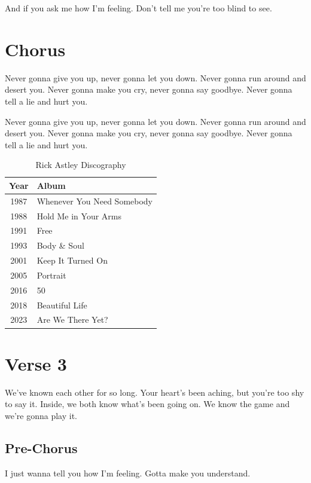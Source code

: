 \documentclass{article}
\begin{document}
And if you ask me how I'm feeling.
Don't tell me you're too blind to see.

\section{Chorus}

Never gonna give you up, never gonna let you down.
Never gonna run around and desert you.
Never gonna make you cry, never gonna say goodbye.
Never gonna tell a lie and hurt you.

Never gonna give you up, never gonna let you down.
Never gonna run around and desert you.
Never gonna make you cry, never gonna say goodbye.
Never gonna tell a lie and hurt you.

\begin{table}
    \centering
    \begin{tabular}{c l}
        \toprule
        Year & Album \\
        \midrule
         1987 & Whenever You Need Somebody \\
         1988 & Hold Me in Your Arms \\
         1991 & Free \\
         1993 & Body \& Soul \\
         2001 & Keep It Turned On \\
         2005 & Portrait \\
         2016 & 50 \\
         2018 & Beautiful Life \\
         2023 & Are We There Yet? \\
         \bottomrule
    \end{tabular}
    \caption{Rick Astley Discography}
    \label{tab:discography}
\end{table}

\section{Verse 3}

We've known each other for so long.
Your heart's been aching, but you're too shy to say it.
Inside, we both know what's been going on.
We know the game and we're gonna play it.

\subsection{Pre-Chorus}

I just wanna tell you how I'm feeling.
Gotta make you understand.
\end{document}
